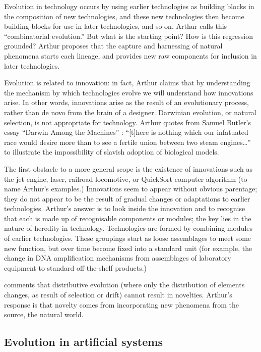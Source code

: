 Evolution in technology occurs by using earlier technologies as building blocks in the composition of new technologies, and these new technologies then become building blocks for use in later
technologies, and so on. Arthur calls this ``combinatorial evolution.'' But what is the starting point? How is this regression grounded? Arthur proposes that the capture and harnessing of natural
phenomena starts each lineage, and provides new raw components for inclusion in later technologies.

Evolution is related to innovation: in fact, Arthur claims that by understanding the mechanism by which technologies evolve we will understand how innovations arise. In other words, innovations arise
as the result of an evolutionary process, rather than de novo from the brain of a designer. Darwinian evolution, or natural selection, is not appropriate for technology. Arthur quotes from Samuel Butler's essay ``Darwin Among the Machines'' : ``{[}t{]}here is nothing which our infatuated race would desire more than to see a fertile union between two steam engines\ldots{}'' to illustrate the impossibility of slavish adoption of biological models.

The first obstacle to a more general scope is the existence of innovations such as the jet engine, laser, railroad locomotive, or QuickSort computer algorithm (to name Arthur's examples.) Innovations seem to appear without obvious parentage; they do not appear to be the result of gradual changes or adaptations to earlier technologies. Arthur's answer is to look inside the innovation and to recognise that each is made up of recognisable components or modules; the key lies in the nature of heredity in technology. Technologies are formed by combining modules of earlier technologies. These groupings start as loose assemblages to meet some new function, but over time become fixed into a standard unit (for example, the change in DNA amplification mechanisms from assemblages of laboratory equipment to standard off-the-shelf products.)

\autocite{Bourrat2015} comments that distributive evolution (where only the distribution of elements changes, as result of selection or drift) cannot result in novelties. Arthur's response is that novelty comes from incorporating new phenomena from the source, the natural world.

\subsection{Evolution in artificial systems}

